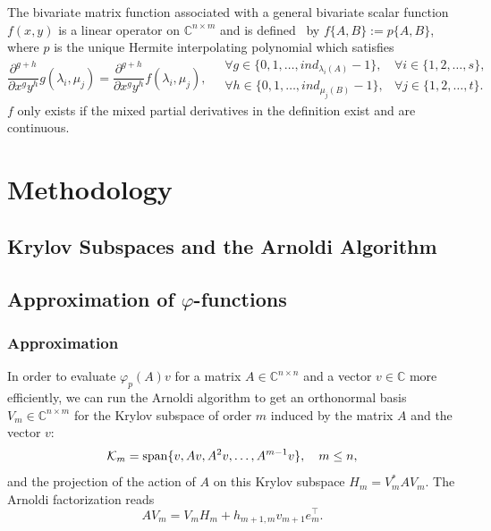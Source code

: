 The bivariate matrix function associated with a general bivariate scalar function $f(x, y)$ is a linear
operator on $\mathbb{C}^{n \times m}$ and is defined~\cite{kressner2014bivariate} by
$f\{A, B\} := p\{A, B\}$, where $p$ is the unique Hermite interpolating polynomial which
satisfies
\begin{equation*}
    \frac{\partial^{g+h}}{\partial x^g y^h}g(\lambda_i, \mu_j)
    = \frac{\partial^{g+h}}{\partial x^g y^h}f(\lambda_i, \mu_j),
    \quad
    \begin{matrix}
        \forall g \in \{0, 1, \dots, ind_{\lambda_i(A)}-1\},
        & \forall i \in \{1, 2, \dots, s\},
        \\
        \forall h \in \{0, 1, \dots, ind_{\mu_j(B)}-1\},
        & \forall j \in \{1, 2, \dots, t\}.
    \end{matrix}
\end{equation*}
$f$ only exists if the mixed partial derivatives in the definition exist and are continuous.

\section{Methodology}\label{sec:methods}

\subsection{Krylov Subspaces and the Arnoldi Algorithm}\label{sec:arnoldi}

\subsection{Approximation of \texorpdfstring{$\varphi$}{Phi}-functions}\label{sec:krylovmethodunivariate}

\subsubsection{Approximation}
In order to evaluate $\varphi_p(A)v$ for a matrix $A \in \mathbb{C}^{n \times n}$ and a vector $v \in \mathbb{C}$
more efficiently, we can run the Arnoldi algorithm to get an orthonormal basis $V_m \in \mathbb{C}^{n \times m}$
for the Krylov subspace of order $m$ induced by the matrix $A$ and the vector $v$:
\begin{equation}
    \label{eq:krylovsubspacedefinition}
    \mathcal{K}_m = \operatorname{span}\{v, Av, A^{2}v, \dots, A^{m-1}v \}, \quad m \leq n,
\end{equation}
and the projection of the action of $A$ on this Krylov subspace $H_m = V_m^* A V_m$. The Arnoldi factorization
reads
\begin{equation}
    \label{eq:arnoldifactorization}
    A V_m = V_m H_m + h_{m+1, m} v_{m+1} e_m^\top.
\end{equation}

